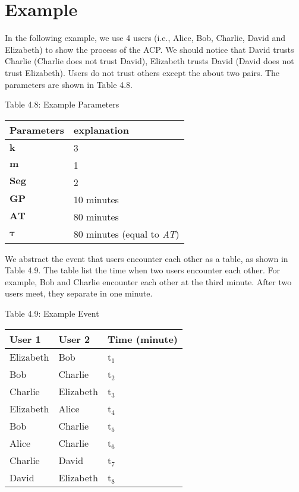 
\section{ Example}

\noindent In the following example, we use 4 users (i.e., Alice, Bob, Charlie, David and Elizabeth) to show the process of the ACP. We should notice that David trusts Charlie (Charlie does not trust David), Elizabeth trusts David (David does not trust Elizabeth). Users do not trust others except the about two pairs. The parameters are shown in Table 4.8.

Table 4.8: Example Parameters

\begin{tabular}{|p{1.2in}|p{2.8in}|} \hline 
Parameters & explanation \\ \hline 
\textbf{$\boldsymbol{k}$}\textit{} & 3 \\ \hline 
\textbf{$\boldsymbol{m}$} & 1 \\ \hline 
\textbf{$\boldsymbol{Seg}$}\textit{} & 2 \\ \hline 
\textbf{$\boldsymbol{G}\boldsymbol{P}$}\textit{} & 10 minutes \\ \hline 
\textbf{$\boldsymbol{AT}$}\textit{} & 80 minutes \\ \hline 
\textbf{$\boldsymbol{\tau }$} & 80 minutes (equal to \textit{AT}) \\ \hline 
\end{tabular}

We abstract the event that users encounter each other as a table, as shown in Table 4.9. The table list the time when two users encounter each other. For example, Bob and Charlie encounter each other at the third minute. After two users meet, they separate in one minute. 

\noindent Table 4.9: Example Event

\begin{tabular}{|p{0.5in}|p{0.5in}|p{0.8in}|} \hline 
User 1 & User 2 & Time (minute) \\ \hline 
Elizabeth & Bob & t${}_{1}$ \\ \hline 
Bob & Charlie & t${}_{2}$ \\ \hline 
Charlie & Elizabeth & t${}_{3}$ \\ \hline 
Elizabeth & Alice & t${}_{4}$ \\ \hline 
Bob & Charlie & t${}_{5}$ \\ \hline 
Alice & Charlie & t${}_{6}$ \\ \hline 
Charlie & David & t${}_{7}$ \\ \hline 
David & Elizabeth & t${}_{8}$ \\ \hline 
\end{tabular}

